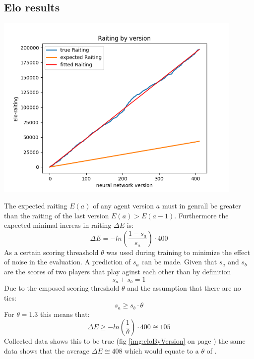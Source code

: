 \documentclass[12pt]{article}
\newcommand{\imgRef}[1]{(fig \ref{#1} on page \pageref{#1})}
\newcommand{\FittedEloRaiting}{408}
\begin{document}
\subsection{Elo results}
\begin{center}
	\includegraphics[width=0.9\textwidth]{eloRaitingByVersion}
	\captionsetup{width=.8\linewidth}
	\label{img:eloByVersion}
\end{center}
The expected raiting \(E(a)\) of any agent version \(a\) must in genrall be greater than the raiting of the last version \(E(a) > E(a-1)\). Furthermore the expected minimal increas in raiting \(\Delta E\) is:
\begin{equation}
\Delta E = -ln(\frac{1-s_a}{s_a})\cdot 400
\end{equation}
As a certain scoring threashold \(\theta\) was used during training to minimize the effect of noise in the evaluation. A prediction of \(s_a\) can be made. Given that \(s_a\) and \(s_b\) are the scores of two players that play aginst each other than by definition
\begin{equation}
s_a + s_b = 1
\end{equation}
Due to the emposed scoring threshold \(\theta\) and the assumption that there are no ties:
\begin{equation}
s_a \geqslant s_b \cdot \theta
\end{equation}
For \(\theta = 1.3\) this means that:
\begin{equation}
\Delta E \geqslant -ln\left(\frac{1}{\theta}\right)\cdot 400 \cong 105
\end{equation}
Collected data shows this to be true \imgRef{img:eloByVersion} the same data shows that the average \(\Delta E \cong \FittedEloRaiting\) which would equate to a \(\theta\) of .
\end{document}
